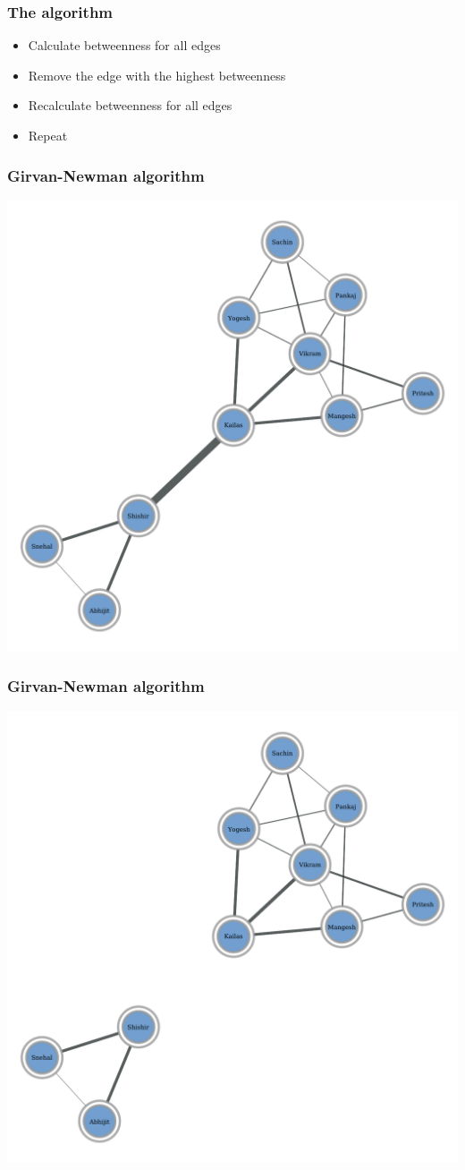 \documentclass{beamer}
\begin{document}
\begin{frame}
    \frametitle{The algorithm}
    \centering

    \begin{itemize}
    \setlength\itemsep{1em}
        \item{Calculate betweenness for all edges}
        \item{Remove the edge with the highest betweenness}
        \item{Recalculate betweenness for all edges}
        \item{Repeat}
    \end{itemize}
\end{frame}
\begin{frame}
    \frametitle{Girvan-Newman algorithm}
    \centering
    \includegraphics[width=0.8\columnwidth]{gn0.pdf}
\end{frame}
\begin{frame}
    \frametitle{Girvan-Newman algorithm}
    \centering
    \includegraphics[width=0.8\columnwidth]{gn1.pdf}
\end{frame}
\end{document}
